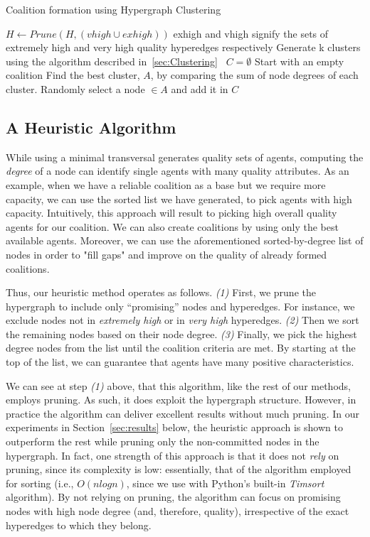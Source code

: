 \begin{algorithm}
	\caption{Coalition formation using Hypergraph Clustering}\label{alg:clustering}
	\begin{algorithmic}[1]
		\State $H \gets Prune(H, (vhigh \cup exhigh))$ \Comment exhigh and vhigh signify the sets of extremely high and very high quality hyperedges respectively
		\State Generate k clusters using the algorithm described in~\ref{sec:Clustering}~\cite{zhou2006learning}
		\State $C = \emptyset$ \Comment Start with an empty coalition
		\State Find the best cluster, $A$, by comparing the sum of node degrees of each cluster.
		\State Randomly select a node $\in A $ and add it in $C$
		\EndWhile        
		
		\EndProcedure
	\end{algorithmic}
\end{algorithm}

\subsection{A Heuristic Algorithm} \label{sec:heuristic}
While using a minimal transversal generates quality sets of agents, computing the {\em degree} of a node can identify single agents with many quality attributes. As an example, when we have a reliable coalition as a base but we require more capacity, we can use the sorted list we have generated, to pick agents with high capacity. Intuitively, this approach will result to picking high overall quality agents for our coalition. We can also create coalitions by using only the best available agents. Moreover, we can use the aforementioned sorted-by-degree list of nodes in order to "fill gaps" and improve on the quality of already formed coalitions. 

Thus, our heuristic method operates as follows. {\em (1)} First, we prune the hypergraph to include only ``promising'' nodes and hyperedges. For instance, we exclude nodes not in {\em extremely high} or in {\em very high} hyperedges. {\em (2)} Then we sort the remaining nodes based on their node degree. {\em (3)}  Finally, we pick the highest degree nodes from the list until the coalition criteria are met. By starting at the top of the list, we can guarantee that agents have many positive characteristics. 

We can see at step {\em (1)} above, that this algorithm, like the rest of our methods, employs pruning. As such, it does exploit the hypergraph structure. However, in practice the algorithm can deliver excellent results without much pruning. In our experiments in Section~\ref{sec:results} below, the heuristic approach is shown to outperform the rest while pruning only the non-committed nodes in the hypergraph. In fact, one strength of this approach is that it does not {\em rely} on pruning, since its complexity is low: essentially, that of the algorithm employed for sorting (i.e., $O(nlogn)$, since we use with Python's built-in {\em Timsort} algorithm). By not relying on pruning, the algorithm can focus on promising nodes with high node degree (and, therefore, quality), irrespective of the exact hyperedges to which they belong.

